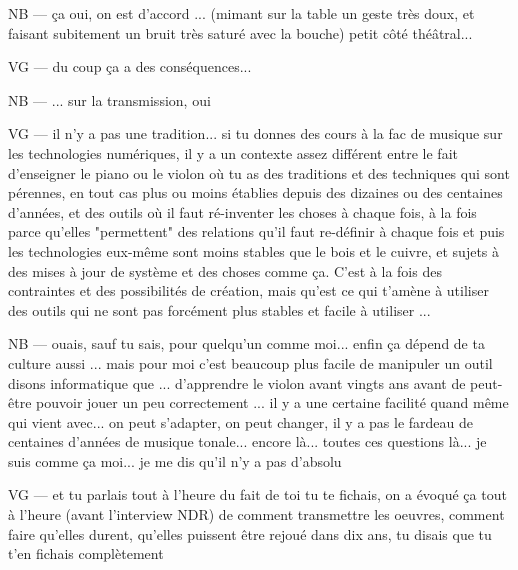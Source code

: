 NB — ça oui, on est d'accord ... (mimant sur la table un geste très doux, et faisant subitement un bruit très saturé avec la bouche) petit côté théâtral... 

VG — du coup ça a des conséquences...

NB — ... sur la transmission, oui

VG — il n'y a pas une tradition... si tu donnes des cours à la fac de musique sur les technologies numériques, il y a un contexte assez différent entre le fait d'enseigner le piano ou le violon où tu as des traditions et des techniques qui sont pérennes, en tout cas plus ou moins établies depuis des dizaines ou des centaines d'années, et des outils où il faut ré-inventer les choses à chaque fois, à la fois parce qu'elles "permettent" des relations qu'il faut re-définir à chaque fois et puis les technologies eux-même sont moins stables que le bois et le cuivre, et sujets à des mises à jour de système et des choses comme ça. C'est à la fois des contraintes et des possibilités de création, mais qu'est ce qui t'amène à utiliser des outils qui ne sont pas forcément plus stables et facile à utiliser ...

NB — ouais, sauf tu sais, pour quelqu'un comme moi... enfin ça dépend de ta culture aussi ... mais pour moi c'est beaucoup plus facile de manipuler un outil disons informatique que ... d'apprendre le violon avant vingts ans avant de peut-être pouvoir jouer un peu correctement ... il y a une certaine facilité quand même qui vient avec...  on peut s'adapter, on peut changer, il y a pas le fardeau de centaines d'années de musique tonale... encore là... toutes ces questions là... je suis comme ça moi... je me dis qu'il n'y a pas d'absolu

VG — et tu parlais tout à l'heure du fait de toi tu te fichais, on a évoqué ça tout à l'heure (avant l'interview NDR) de comment transmettre les oeuvres, comment faire qu'elles durent, qu'elles puissent être rejoué dans dix ans, tu disais que tu t'en fichais complètement 

